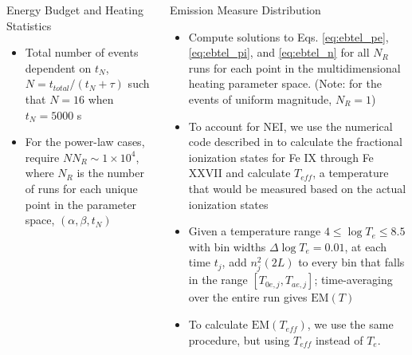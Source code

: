 \documentclass[final]{beamer}
\begin{document}
\begin{frame}
\begin{columns}[T]
\begin{column}{0.49\linewidth}
\begin{block}{Energy Budget and Heating Statistics}
\begin{itemize}
\begin{itemize}
        \end{itemize}
        \item Total number of events dependent on $t_N$, $N=t_{total}/(t_N + \tau)$ such that $N=16$ when $t_N=5000$ s
        \item For the power-law cases, require $NN_R\sim1\times10^4$, where $N_R$ is the number of runs for each unique point in the parameter space, $(\alpha,\beta,t_N)$
      \end{itemize}
    \end{block}
  \end{column}
  \begin{column}{0.49\linewidth}
    \begin{block}{Emission Measure Distribution}
      \vspace{-1ex}
      \begin{itemize}
        \item Compute solutions to Eqs. \ref{eq:ebtel_pe}, \ref{eq:ebtel_pi}, and \ref{eq:ebtel_n} for all $N_R$ runs for each point in the multidimensional heating parameter space. (Note: for the events of uniform magnitude, $N_R=1$)
        \item To account for NEI, we use the numerical code described in \citet{bradshaw_numerical_2009} to calculate the fractional ionization states for Fe IX through Fe XXVII and calculate $T_{eff}$, a temperature that would be measured based on the actual ionization states
        \item Given a temperature range $4\le\log{T_e}\le8.5$ with bin widths $\Delta\log{T_e}=0.01$, at each time $t_j$, add $n_j^2(2L)$ to every bin that falls in the range $[T_{0e,j},T_{ae,j}]$; time-averaging over the entire run gives $\mathrm{EM}(T)$
        \item To calculate $\mathrm{EM}(T_{eff})$, we use the same procedure, but using $T_{eff}$ instead of $T_e$.
      \end{itemize}
      \vspace{-2ex}
      \begin{figure}
        \centering
\end{figure}
\end{block}
\end{column}
\end{columns}
\end{frame}
\end{document}
